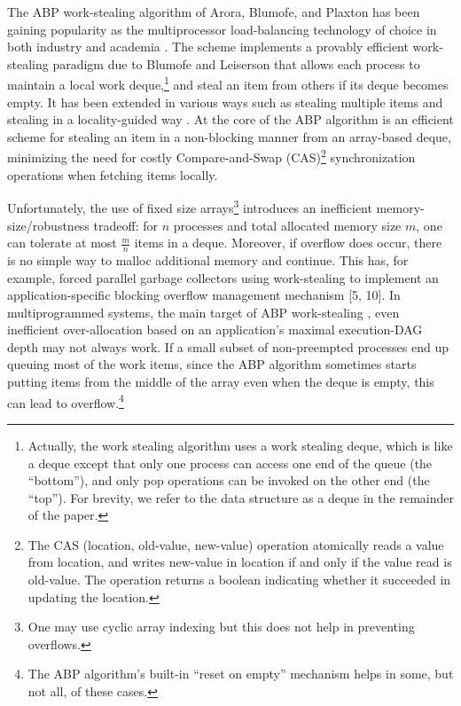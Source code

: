 The ABP work-stealing algorithm of Arora, Blumofe, and Plaxton
\cite{Arora2001} has been gaining popularity as the multiprocessor
load-balancing technology of choice in both industry and academia
\cite{Arora2001, Acar2002, Blumofe1995, Frigo1998, Danaher2005}. The
scheme implements a provably efficient work-stealing paradigm due to
Blumofe and Leiserson \cite{Blumofe1999} that allows each process to
maintain a local work deque,\footnote{Actually, the work stealing
  algorithm uses a work stealing deque, which is like a deque
  \cite{Knuth1997} except that only one process can access one end of
  the queue (the ``bottom''), and only pop operations can be invoked
  on the other end (the ``top''). For brevity, we refer to the data
  structure as a deque in the remainder of the paper.} and steal an
item from others if its deque becomes empty. It has been extended in
various ways such as stealing multiple items \cite{Hendler2002} and
stealing in a locality-guided way \cite{Acar2002}. At the core of the
ABP algorithm is an efficient scheme for stealing an item in a
non-blocking manner from an array-based deque, minimizing the need for
costly Compare-and-Swap (CAS)\footnote{The CAS (location, old-value,
  new-value) operation atomically reads a value from location, and
  writes new-value in location if and only if the value read is
  old-value. The operation returns a boolean indicating whether it
  succeeded in updating the location.} synchronization operations when
fetching items locally.

Unfortunately, the use of fixed size arrays\footnote{One may use
  cyclic array indexing but this does not help in preventing
  overflows.} introduces an inefficient memory-size/robustness
tradeoff: for $n$ processes and total allocated memory size $m$, one
can tolerate at most $\frac{m}{n}$ items in a deque. Moreover, if
overflow does occur, there is no simple way to malloc additional
memory and continue. This has, for example, forced parallel garbage
collectors using work-stealing to implement an application-specific
blocking overflow management mechanism [5, 10]. In multiprogrammed
systems, the main target of ABP work-stealing \cite{Arora2001}, even
inefficient over-allocation based on an application's maximal
execution-DAG depth \cite{Arora2001, Blumofe1999} may not always
work. If a small subset of non-preempted processes end up queuing most
of the work items, since the ABP algorithm sometimes starts putting
items from the middle of the array even when the deque is empty, this
can lead to overflow.\footnote{The ABP algorithm's built-in ``reset on
  empty'' mechanism helps in some, but not all, of these cases.}

